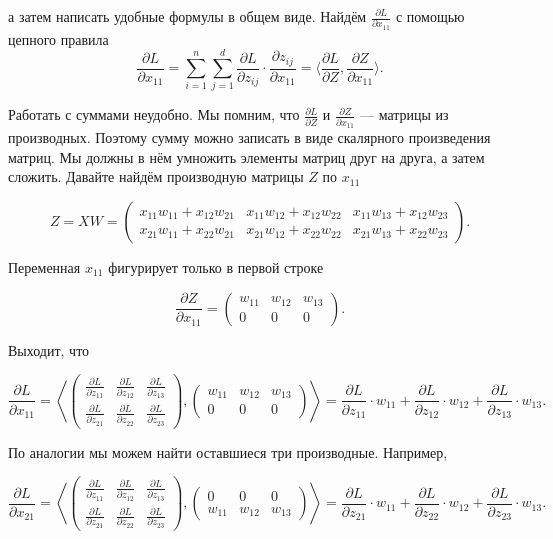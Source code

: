 \begin{sol}
а затем написать удобные формулы в общем виде. Найдём $\frac{\partial L}{\partial x_{11}}$ с помощью цепного правила 
\[
\frac{\partial L}{\partial x_{11}} = \sum_{i=1}^n \sum_{j=1}^d \frac{\partial L}{\partial z_{ij}} \cdot \frac{\partial z_{ij}}{\partial x_{11}} = \langle \frac{\partial L}{\partial Z} , \frac{\partial Z}{\partial x_{11}} \rangle.
\]

Работать с суммами неудобно. Мы помним, что $\frac{\partial L}{\partial Z}$ и $\frac{\partial Z}{\partial x_{11}}$ --- матрицы из производных. Поэтому сумму можно записать в виде скалярного произведения матриц. Мы должны в нём умножить элементы матриц друг на друга, а затем сложить.  Давайте найдём производную матрицы $Z$ по $x_{11}$

\[
	Z = XW = \begin{pmatrix} x_{11}w_{11} + x_{12}w_{21} & x_{11}w_{12} + x_{12}w_{22} & x_{11}w_{13} + x_{12}w_{23} \\ x_{21}w_{11} + x_{22}w_{21} & x_{21}w_{12} + x_{22}w_{22} & x_{21}w_{13} + x_{22}w_{23} \end{pmatrix}.
\]

Переменная $x_{11}$ фигурирует только в первой строке

\[
\frac{\partial Z}{\partial x_{11}} = \begin{pmatrix} w_{11} & w_{12}  & w_{13} \\ 0 & 0 & 0 \end{pmatrix}.
\]

Выходит, что 

\[
\frac{\partial L}{\partial x_{11}}  =  \left\langle \begin{pmatrix} \frac{\partial L}{\partial z_{11}}  & \frac{\partial L}{\partial z_{12}} & \frac{\partial L}{\partial z_{13}} \\ \frac{\partial L}{\partial z_{21}}  & \frac{\partial L}{\partial z_{22}} & \frac{\partial L}{\partial z_{23}}  \end{pmatrix} , \begin{pmatrix} w_{11} & w_{12}  & w_{13} \\ 0 & 0 & 0 \end{pmatrix} \right\rangle = \frac{\partial L}{\partial z_{11}} \cdot w_{11} + \frac{\partial L}{\partial z_{12}} \cdot w_{12} +  \frac{\partial L}{\partial z_{13}} \cdot w_{13}.
\]

По аналогии мы можем найти оставшиеся три производные. Например,

\[
\frac{\partial L}{\partial x_{21}}  =  \left\langle \begin{pmatrix} \frac{\partial L}{\partial z_{11}}  & \frac{\partial L}{\partial z_{12}} & \frac{\partial L}{\partial z_{13}} \\ \frac{\partial L}{\partial z_{21}}  & \frac{\partial L}{\partial z_{22}} & \frac{\partial L}{\partial z_{23}}  \end{pmatrix} , \begin{pmatrix} 0 & 0 & 0 \\ w_{11} & w_{12}  & w_{13}  \end{pmatrix} \right\rangle = \frac{\partial L}{\partial z_{21}} \cdot w_{11} + \frac{\partial L}{\partial z_{22}} \cdot w_{12} +  \frac{\partial L}{\partial z_{23}} \cdot w_{13}.
\]


\end{sol}
